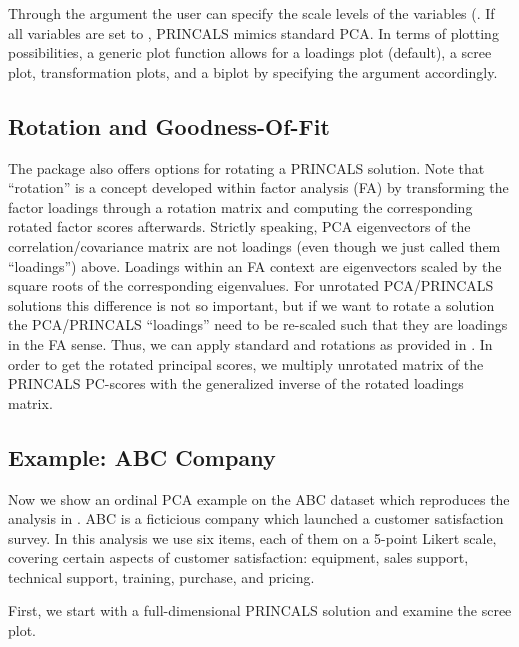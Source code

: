 \documentclass[10pt,nojss,nofooter,fleqn]{jss}\usepackage[]{graphicx}\usepackage[]{color}
\begin{document}
Through the  argument the user can specify the scale levels of the variables (. If all variables are set to , PRINCALS mimics standard PCA. In terms of plotting possibilities, a generic plot function allows for a loadings plot (default), a scree plot, transformation plots, and a biplot by specifying the 
 argument accordingly. 

\subsection{Rotation and Goodness-Of-Fit}
The package also offers options for rotating a PRINCALS solution. Note that ``rotation'' is a concept developed within factor 
analysis (FA) by transforming the factor loadings through a rotation matrix and computing the corresponding rotated factor scores 
afterwards. Strictly speaking, PCA eigenvectors of the correlation/covariance matrix are not loadings (even though we just called them ``loadings'') above. Loadings within an FA context are eigenvectors scaled by the square roots of the corresponding eigenvalues. 
For unrotated PCA/PRINCALS solutions this difference is not so important, but if we want to rotate a solution the PCA/PRINCALS 
``loadings'' need to be re-scaled such that they are loadings in the FA sense. Thus, we can apply standard  and  rotations as provided in . In order to get the rotated principal scores, we multiply unrotated matrix 
of the PRINCALS PC-scores with the generalized inverse of the rotated loadings matrix. 


\subsection{Example: ABC Company}
Now we show an ordinal PCA example on the ABC dataset which reproduces the analysis in \cite{Ferrari+Barbiero:2012}. 
ABC is a ficticious company which launched a customer satisfaction survey. In this analysis we use six items, 
each of them on a 5-point Likert scale, covering certain aspects of customer satisfaction: 
equipment, sales support, technical support, training, purchase, and pricing. 

First, we start with a full-dimensional PRINCALS solution and examine the scree plot.
\end{document}

